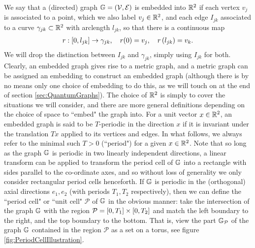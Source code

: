 We say that a (directed) graph $\mathbb{G} = \left( \mathcal{V},\mathcal{E} \right)$ is embedded into $\mathbb{R}^2$ if each vertex $v_j$ is associated to a point, which we also label $v_j\in\mathbb{R}^2$, and each edge $I_{jk}$ associated to a curve $\gamma_{jk}\subset\mathbb{R}^2$ with arclength $l_{jk}$, so that there is a continuous map
\begin{align} \label{eq:GeneralCurveParam}
	r: \left[ 0,l_{jk} \right] \rightarrow \gamma_{jk}, \quad r(0) = v_j, \quad r\left( l_{jk} \right) = v_k.
\end{align}
We will drop the distinction between $I_{jk}$ and $\gamma_{jk}$, simply using $I_{jk}$ for both.
Clearly, an embedded graph gives rise to a metric graph, and a metric graph can be assigned an embedding to construct an embedded graph (although there is by no means only one choice of embedding to do this, as we will touch on at the end of section \ref{sec:QuantumGraphs}).
The choice of $\mathbb{R}^2$ is simply to cover the situations we will consider, and there are more general definitions depending on the choice of space to ``embed" the graph into.
For a unit vector $x\in\mathbb{R}^2$, an embedded graph is said to be $T$-periodic in the direction $x$ if it is invariant under the translation $Tx$ applied to its vertices and edges.
In what follows, we always refer to the minimal such $T>0$ (``period") for a given $x\in\mathbb{R}^2$.
Note that so long as the graph $\mathbb{G}$ is periodic in two linearly independent directions, a linear transform can be applied to transform the period cell of $\mathbb{G}$ into a rectangle with sides parallel to the co-ordinate axes, and so without loss of generality we only consider rectangular period cells henceforth.
If $\mathbb{G}$ is periodic in the (orthogonal) axial directions $e_1, e_2$ (with periods $T_1, T_2$ respectively), then we can define the ``period cell" or ``unit cell" $\mathcal{P}$ of $\mathbb{G}$ in the obvious manner: take the intersection of the graph $\mathbb{G}$ with the region $\mathcal{P} = \left[ 0,T_1 \right]\times\left[ 0,T_2 \right]$ and match the left boundary to the right, and the top boundary to the bottom.
That is, view the part $\mathbb{G}_{\mathcal{P}}$ of the graph $\mathbb{G}$ contained in the region $\mathcal{P}$ as a set on a torus, see figure \ref{fig:PeriodCellIllustration}.
